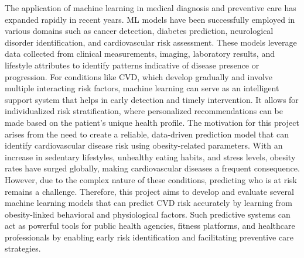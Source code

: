 The application of machine learning in medical diagnosis and preventive care has expanded rapidly in recent years.
ML models have been successfully employed in various domains such as cancer detection, diabetes prediction, neurological disorder identification, and cardiovascular risk assessment.
These models leverage data collected from clinical measurements, imaging, laboratory results, and lifestyle attributes to identify patterns indicative of disease presence or progression.
For conditions like CVD, which develop gradually and involve multiple interacting risk factors, machine learning can serve as an intelligent support system that helps in early detection and timely intervention.
It allows for individualized risk stratification, where personalized recommendations can be made based on the patient’s unique health profile.
The motivation for this project arises from the need to create a reliable, data-driven prediction model that can identify cardiovascular disease risk using obesity-related parameters.
With an increase in sedentary lifestyles, unhealthy eating habits, and stress levels, obesity rates have surged globally, making cardiovascular diseases a frequent consequence.
However, due to the complex nature of these conditions, predicting who is at risk remains a challenge.
Therefore, this project aims to develop and evaluate several machine learning models that can predict CVD risk accurately by learning from obesity-linked behavioral and physiological factors.
Such predictive systems can act as powerful tools for public health agencies, fitness platforms, and healthcare professionals by enabling early risk identification and facilitating preventive care strategies.

